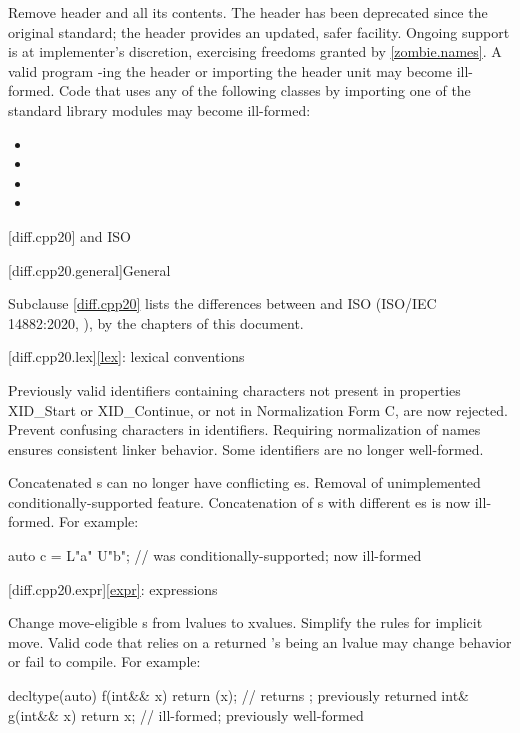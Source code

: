 \nodiffref
\change
Remove header  and all its contents.
\rationale
The header has been deprecated since the original \Cpp{} standard; the
 header provides an updated, safer facility.
Ongoing support is at implementer's discretion,
exercising freedoms granted by \ref{zombie.names}.
\effect
A valid \CppXXIII{} program -ing the header or importing the
header unit may become ill-formed. Code that uses any of the following classes
by importing one of the standard library modules may become ill-formed:
\begin{itemize}
\item {}
\item {}
\item {}
\item {}
\end{itemize}

[diff.cpp20]{\Cpp{} and ISO \CppXX{}}

[diff.cpp20.general]{General}

\pnum
{}%
Subclause \ref{diff.cpp20} lists the differences between \Cpp{} and
ISO \CppXX{} (ISO/IEC 14882:2020, ),
by the chapters of this document.

[diff.cpp20.lex]{\ref{lex}: lexical conventions}

\change
Previously valid identifiers containing characters
not present in  properties XID_Start or XID_Continue, or
not in Normalization Form C, are now rejected.
\rationale
Prevent confusing characters in identifiers.
Requiring normalization of names ensures consistent linker behavior.
\effect
Some identifiers are no longer well-formed.

\change
Concatenated s can no longer have
conflicting es.
\rationale
Removal of unimplemented conditionally-supported feature.
\effect
Concatenation of s
with different es
is now ill-formed.
For example:
\begin{codeblock}
auto c = L"a" U"b";             // was conditionally-supported; now ill-formed
\end{codeblock}

[diff.cpp20.expr]{\ref{expr}: expressions}

\change
Change move-eligible s from lvalues to xvalues.
\rationale
Simplify the rules for implicit move.
\effect
Valid \CppXX{} code that relies on a returned 's
being an lvalue may change behavior or fail to compile.
For example:
\begin{codeblock}
decltype(auto) f(int&& x) { return (x); }       // returns ; previously returned 
int& g(int&& x) { return x; }                   // ill-formed; previously well-formed
\end{codeblock}

